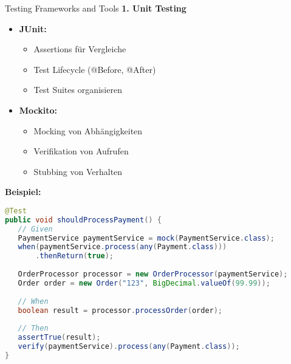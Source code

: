 \begin{KR}{Testing Frameworks and Tools}
\textbf{1. Unit Testing}
\begin{itemize}
   \item \textbf{JUnit:}
   \begin{itemize}
       \item Assertions für Vergleiche
       \item Test Lifecycle (@Before, @After)
       \item Test Suites organisieren
   \end{itemize}
   \item \textbf{Mockito:}
   \begin{itemize}
       \item Mocking von Abhängigkeiten
       \item Verifikation von Aufrufen
       \item Stubbing von Verhalten
   \end{itemize}
\end{itemize}

\textbf{Beispiel:}
\begin{lstlisting}[language=Java, style=basesmol]
@Test
public void shouldProcessPayment() {
   // Given
   PaymentService paymentService = mock(PaymentService.class);
   when(paymentService.process(any(Payment.class)))
       .thenReturn(true);
   
   OrderProcessor processor = new OrderProcessor(paymentService);
   Order order = new Order("123", BigDecimal.valueOf(99.99));
   
   // When
   boolean result = processor.processOrder(order);
   
   // Then
   assertTrue(result);
   verify(paymentService).process(any(Payment.class));
}
\end{lstlisting}
\end{KR}

